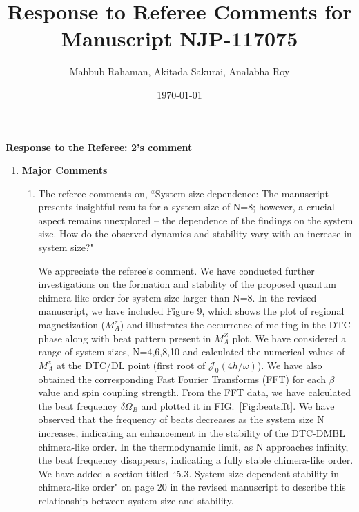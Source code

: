 \documentclass[aps,prb,reprint,showpacs,floatfix,superscriptaddress, onecolumn, nofootinbib, 10pt]{revtex4-2}
\newcommand{\response}[1]{{\color{black}#1}} %
\newcommand{\comment}[1]{{\color{blue}#1}} %
\newcommand{\figref}[1]{FIG.~\ref{#1}}
\begin{document}

\title{Response to Referee Comments for Manuscript NJP-117075}
\author{Mahbub Rahaman, Akitada Sakurai, Analabha Roy}
\date{\today}

\maketitle

\vspace{1em}

\noindent \textbf{Response to the Referee: 2's comment}
\begin{enumerate}
	\item {\bf Major Comments}
	\begin{enumerate}
		\item The referee comments on, \comment{``System size dependence: The manuscript presents insightful results for a system size
				of N=8; however, a crucial aspect remains unexplored – the dependence of the
				findings on the system size. How do the observed dynamics and stability vary with an
				increase in system size?"}\\
		
		\response{
			We appreciate the referee's comment. We have conducted further investigations on the formation and stability of the proposed quantum chimera-like order for system size larger than N=8. In the revised manuscript, we have included Figure 9, which shows the plot of regional magnetization ($M^z_A$) and illustrates the occurrence of melting in the DTC phase along with beat pattern present in $M^Z_A$ plot. We have considered a range of system sizes, N=4,6,8,10 and calculated the numerical values of $M^z_A$ at the DTC/DL point (first root of $\mathcal{J}_0(4h/\omega)$). We have also obtained the corresponding Fast Fourier Transforms (FFT) for each $\beta$ value and spin coupling strength. From the FFT data, we have calculated the beat frequency $\delta \Omega_B$ \cite{Liu2023,CHANDRA2024129552}  and plotted it in \figref{Fig:beatsfft}. We have observed that the frequency of beats decreases as the system size N increases, indicating an enhancement in the stability of the DTC-DMBL chimera-like order. In the thermodynamic limit, as N approaches infinity, the beat frequency disappears, indicating a fully stable chimera-like order. We have added a section titled ``5.3. System size-dependent stability in chimera-like order" on page 20 in the revised manuscript to describe this relationship between system size and stability.


}
\end{enumerate}
\end{enumerate}
\end{document}
